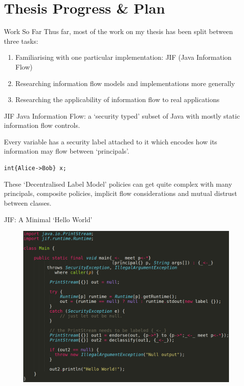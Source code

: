 \section{Thesis Progress \& Plan}

\begin{frame}{Work So Far}
	Thus far, most of the work on my thesis has been split between three tasks:
	
	\begin{enumerate}
		\item Familiarising with one particular implementation: JIF (Java Information Flow)
		\item Researching information flow models and implementations more generally
		\item Researching the applicability of information flow to real applications
	\end{enumerate}
\end{frame}

\begin{frame}{JIF}
	Java Information Flow: a `security typed' subset of Java with mostly static information flow controls.
	
	Every variable has a security label attached to it which encodes how its information may flow between `principals'.
	
	\texttt{int\{Alice->Bob\} x;}
	
	These `Decentralised Label Model' \cite{work:myersdlm} policies can get quite complex with many principals, composite policies, implicit flow considerations and mutual distrust between classes.
\end{frame}

\begin{frame}{JIF: A Minimal `Hello World'}
	\begin{figure}
		\includegraphics[width=\linewidth]{content/images/jif_helloworld.png}
	\end{figure}
\end{frame}

